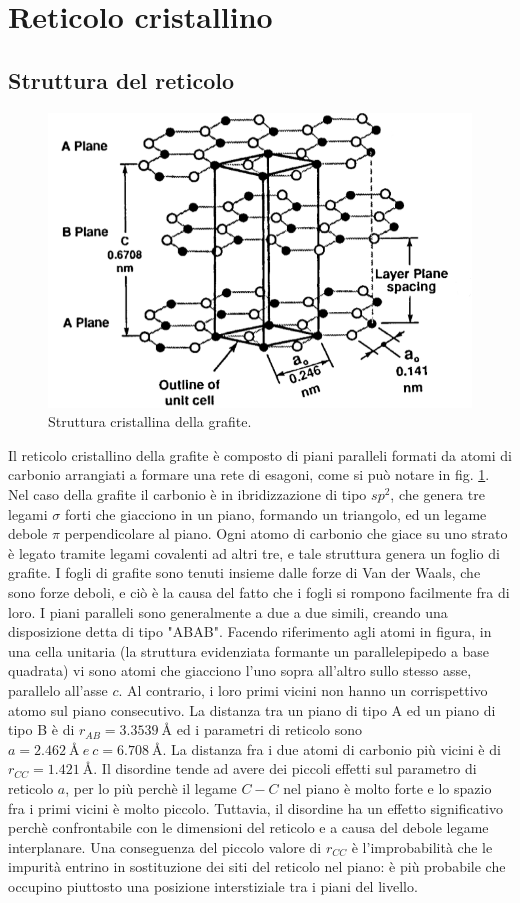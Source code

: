 \documentclass[a4paper,titlepage]{book}
\begin{document}
\section{Reticolo cristallino}
\subsection{Struttura del reticolo}
\begin{figure}[h!] 
	\centering
	\includegraphics[width=0.8\columnwidth]{ABAB.png}
	\caption{ 	\label{AB}
		Struttura cristallina della grafite.
	}
\end{figure}
Il reticolo cristallino della grafite è composto di piani paralleli formati da atomi di carbonio arrangiati a formare una rete di esagoni, come si può notare in fig. \ref{AB}.
Nel caso della grafite il carbonio è in ibridizzazione di tipo $sp^2$, che genera tre legami $\sigma$ forti che giacciono in un piano, formando un triangolo, ed un legame debole $\pi$ perpendicolare al piano. Ogni atomo di carbonio che giace su uno strato è legato tramite legami covalenti ad altri tre, e tale struttura genera un foglio di grafite. I fogli di grafite sono tenuti insieme dalle forze di Van der Waals, che sono forze deboli, e ciò è la causa del fatto che i fogli si rompono facilmente fra di loro. 
I piani paralleli sono generalmente a due a due simili, creando una disposizione detta di tipo "ABAB". Facendo riferimento agli atomi in figura, in una cella unitaria (la struttura evidenziata formante un parallelepipedo a base quadrata) vi sono atomi che giacciono l'uno sopra all'altro sullo stesso asse, parallelo all'asse $c$.  Al contrario, i loro primi vicini non hanno un corrispettivo atomo sul piano consecutivo. La distanza tra un piano di tipo A ed un piano di tipo B è di $r_{AB}=\SI{3.3539}\angstrom$ ed i parametri di reticolo sono $a= \SI{2.462}\angstrom \: e \: c= \SI{6.708}\angstrom$. La distanza fra i due atomi di carbonio più vicini è di $r_{CC}=\SI{1.421}\angstrom$.
Il disordine tende ad avere dei piccoli effetti sul parametro di reticolo $a$, per lo più perchè il legame $C-C$ nel piano è molto forte e lo spazio fra i primi vicini è molto piccolo. Tuttavia, il disordine ha un effetto significativo perchè confrontabile con le dimensioni del reticolo e a causa del debole legame interplanare. Una conseguenza del piccolo valore di $r_{CC}$ è l'improbabilità che le impurità entrino in sostituzione dei siti del reticolo nel piano: è più probabile che occupino piuttosto una posizione interstiziale tra i piani del livello.
\end{document}
